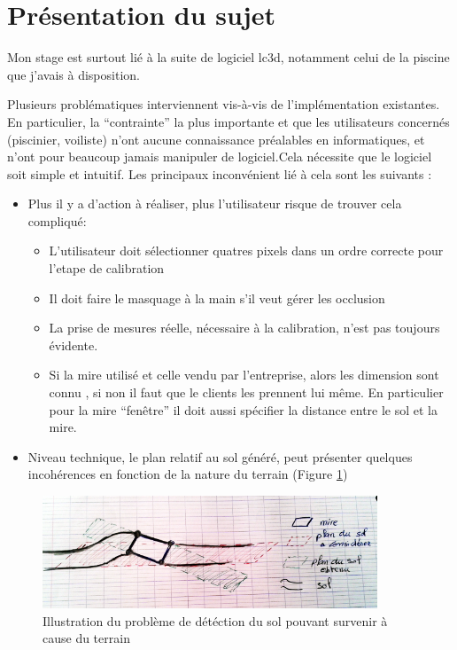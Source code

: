 \section{Présentation du sujet}

Mon stage est surtout lié à la suite de logiciel \gls{lc3d}, notamment celui de la piscine que j’avais à disposition.

Plusieurs problématiques interviennent vis-à-vis de l’implémentation existantes. En particulier, la “contrainte” la plus importante et que les utilisateurs concernés (piscinier, voiliste) n’ont aucune connaissance préalables en informatiques, et n’ont pour beaucoup jamais manipuler de logiciel.Cela nécessite que le logiciel soit simple et intuitif.
Les principaux inconvénient lié à cela sont les suivants :
\begin{itemize}
    \item Plus il y a d’action à réaliser, plus l’utilisateur risque de trouver cela compliqué: 
        \begin{itemize}
            \item L'utilisateur doit sélectionner quatres pixels dans un ordre correcte pour l'etape de calibration
            \item Il doit faire le masquage à la main s’il veut gérer les occlusion
            \item La prise de mesures réelle, nécessaire à la calibration, n’est pas toujours évidente.
            \item Si la mire utilisé et celle vendu par l’entreprise, alors les dimension sont connu , si non il faut que le clients les prennent lui même. En particulier pour la mire “fenêtre” il doit aussi spécifier la distance entre le sol et la mire.
        \end{itemize}
    \item Niveau technique, le plan relatif au sol généré, peut présenter quelques incohérences en fonction de la nature du terrain (Figure \ref{fig:problemsol}) 
\end{itemize}

\begin{figure}[!ht]
\centering
\includegraphics[width = 10cm] {images/croquisProblemeSol.jpg}
\caption{Illustration du problème de détéction du sol pouvant survenir à cause du terrain }
\label{fig:problemsol}
\end{figure}

